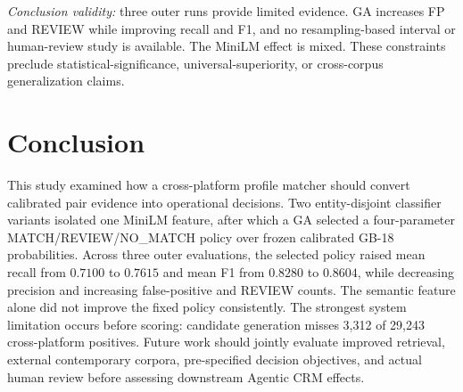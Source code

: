\documentclass[conference]{IEEEtran}
\begin{document}
\emph{Conclusion validity:} three outer runs provide limited evidence. GA increases FP and REVIEW while improving recall and F1, and no resampling-based interval or human-review study is available. The MiniLM effect is mixed. These constraints preclude statistical-significance, universal-superiority, or cross-corpus generalization claims.

\section{Conclusion}
This study examined how a cross-platform profile matcher should convert calibrated pair evidence into operational decisions. Two entity-disjoint classifier variants isolated one MiniLM feature, after which a GA selected a four-parameter MATCH/REVIEW/NO\_MATCH policy over frozen calibrated GB-18 probabilities. Across three outer evaluations, the selected policy raised mean recall from $0.7100$ to $0.7615$ and mean F1 from $0.8280$ to $0.8604$, while decreasing precision and increasing false-positive and REVIEW counts. The semantic feature alone did not improve the fixed policy consistently. The strongest system limitation occurs before scoring: candidate generation misses 3,312 of 29,243 cross-platform positives. Future work should jointly evaluate improved retrieval, external contemporary corpora, pre-specified decision objectives, and actual human review before assessing downstream Agentic CRM effects.



\end{document}
